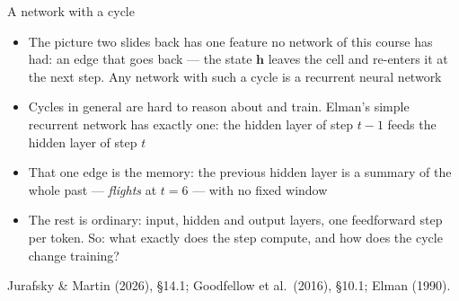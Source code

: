 \documentclass[aspectratio=169, 11pt]{beamer}
\newcommand{\srcline}[1]{%
  \par\vspace{0.25em}%
  {\scriptsize\color{mcMuted}\hfill #1\par}}
\begin{document}
\begin{frame}{A network with a cycle}
  \vspace{-0.2em}
  {\footnotesize
  \begin{itemize}\itemsep0.25em
    \item The picture two slides back has one feature no network of
          this course has had: an edge that goes \alert{back} --- the state
          $\mathbf{h}$ leaves the cell and re-enters it at the next step.
          Any network with such a cycle is a \alert{recurrent neural network}
    \item Cycles in general are hard to reason about and train. Elman's
          \alert{simple recurrent network} has exactly one: the hidden
          layer of step $t-1$ feeds the hidden layer of step $t$
    \item That one edge is the memory: the previous hidden layer is a
          summary of the whole past --- \emph{flights} at $t = 6$ --- with
          no fixed window
    \item The rest is ordinary: input, hidden and output layers, one
          feedforward step per token. So: what exactly does the step
          compute, and how does the cycle change training?
  \end{itemize}}
  \srcline{Jurafsky \& Martin (2026), \S14.1; Goodfellow et al.\ (2016), \S10.1; Elman (1990).}
\end{frame}
\end{document}
